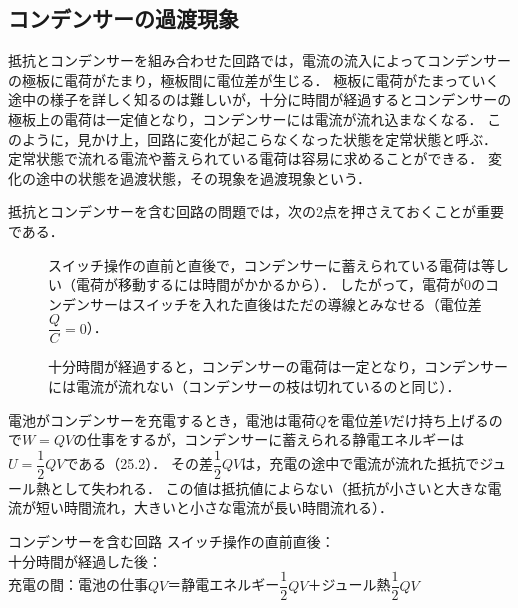 \subsection{コンデンサーの過渡現象}

抵抗とコンデンサーを組み合わせた回路では，電流の流入によってコンデンサーの極板に電荷がたまり，極板間に電位差が生じる．
極板に電荷がたまっていく途中の様子を詳しく知るのは難しいが，{\gtfamily 十分に時間が経過するとコンデンサーの極板上の電荷は一定値となり，コンデンサーには電流が流れ込まなくなる}．
このように，見かけ上，回路に変化が起こらなくなった状態を{\gtfamily 定常状態}と呼ぶ．
定常状態で流れる電流や蓄えられている電荷は容易に求めることができる．
変化の途中の状態を{\gtfamily 過渡状態}，その現象を{\gtfamily 過渡現象}という．

抵抗とコンデンサーを含む回路の問題では，次の2点を押さえておくことが重要である．
\begin{description}
\item[] {\gtfamily スイッチ操作の直前と直後で，コンデンサーに蓄えられている電荷は等しい}（電荷が移動するには時間がかかるから）．
      したがって，電荷が$0$のコンデンサーはスイッチを入れた直後は{\gtfamily ただの導線}とみなせる（電位差$\dfrac{Q}{C}=0$）．
\item[] {\gtfamily 十分時間が経過すると，コンデンサーの電荷は一定となり，コンデンサーには電流が流れない}（コンデンサーの枝は切れているのと同じ）．
\end{description}

電池がコンデンサーを充電するとき，電池は電荷$Q$を電位差$V$だけ持ち上げるので$W=QV$の仕事をするが，コンデンサーに蓄えられる静電エネルギーは$U=\dfrac{1}{2}QV$である（25.2）．
その差$\dfrac{1}{2}QV$は，充電の途中で電流が流れた{\gtfamily 抵抗でジュール熱として失われる}．
この値は抵抗値によらない（抵抗が小さいと大きな電流が短い時間流れ，大きいと小さな電流が長い時間流れる）．

\bsNeed{34mm}
\begin{matome}{コンデンサーを含む回路}
 \hspace{3mm} スイッチ操作の直前直後：\\
 \hspace{3mm} 十分時間が経過した後：\\
 \hspace{3mm} 充電の間：電池の仕事$QV$＝静電エネルギー$\dfrac{1}{2}QV$＋ジュール熱$\dfrac{1}{2}QV$
\end{matome}

